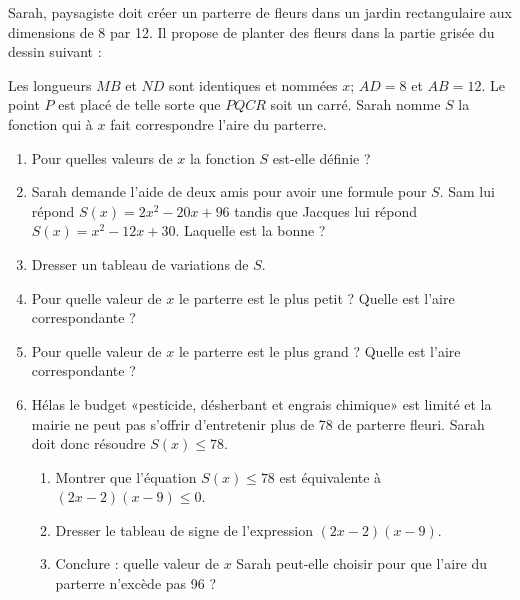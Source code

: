 
\begin{exercice}\label{exosmath-0715}

    \begin{multicols}{2}

    Sarah, paysagiste doit créer un parterre de fleurs dans un jardin rectangulaire aux dimensions de \unit{8}{\meter} par \unit{12}{\meter}. Il propose de planter des fleurs dans la partie grisée du dessin suivant :

\begin{center}
   
\end{center}

Les longueurs \( MB\) et \( ND\) sont identiques et nommées \( x\); \( AD=8\) et \( AB=12\). Le point \( P\) est placé de telle sorte que \( PQCR\) soit un carré. Sarah nomme \( S\) la fonction qui à \( x\) fait correspondre l'aire du parterre.

\begin{enumerate}
    \item
        Pour quelles valeurs de \( x\) la fonction \( S\) est-elle définie ?
    \item
        Sarah demande l'aide de deux amis pour avoir une formule pour \( S\). Sam lui répond \( S(x)=2x^2-20x+96\) tandis que Jacques lui répond \( S(x)=x^2-12x+30\). Laquelle est la bonne ?
            \item
                Dresser un tableau de variations de \( S\).
            \item
                Pour quelle valeur de \( x\) le parterre est le plus petit ? Quelle est l'aire correspondante ?
            \item
                Pour quelle valeur de \( x\) le parterre est le plus grand ? Quelle est l'aire correspondante ?
    \item
        Hélas le budget «pesticide, désherbant et engrais chimique» est limité et la mairie ne peut pas s'offrir d'entretenir plus de \unit{78}{\squared\meter} de parterre fleuri. Sarah doit donc résoudre \( S(x)\leq 78\).
        \begin{enumerate}
            \item
                Montrer que l'équation \( S(x)\leq 78\) est équivalente à \( (2x-2)(x-9)\leq 0\).
            \item
                Dresser le tableau de signe de l'expression \( (2x-2)(x-9)\).
            \item
                Conclure : quelle valeur de \( x\) Sarah peut-elle choisir pour que l'aire du parterre n'excède pas \unit{96}{\squared\meter} ?
        \end{enumerate}
\end{enumerate}
    \end{multicols}

\end{exercice}
